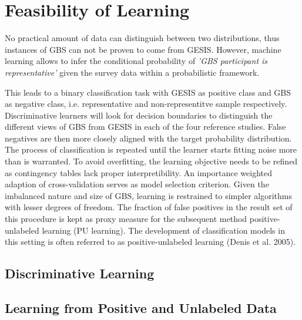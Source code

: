 \chapter{Feasibility of Learning}\label{Sec:Feasibility of Learning}

No practical amount of data can distinguish between two distributions, thus instances of GBS can not be proven to come from GESIS. However, machine learning allows to infer the conditional probability of \textit{'GBS participant is representative'} given the survey data within a probabilistic framework. 

This leads to a binary classification task with GESIS as positive class and GBS as negative class, i.e. representative and non-representitve sample respectively. Discriminative learners will look for decision boundaries to distinguish the different views of GBS from GESIS in each of the four reference studies. False negatives are then more closely aligned with the target probability distribution. The process of classification is repeated until the learner starts fitting noise more than is warranted. To avoid overfitting, the learning objective needs to be refined as contingency tables lack proper interpretibility. An importance weighted adaption of cross-validation serves as model selection criterion. Given the imbalanced nature and size of GBS, learning is restrained to simpler algorithms with lesser degrees of freedom. The fraction of false positives in the result set of this procedure is kept as proxy measure for the subsequent method positive-unlabeled learning (PU learning). The development of classiﬁcation models in this setting is often referred to as positive-unlabeled learning (Denis et al. 2005).



\section{Discriminative Learning}

\section{Learning from Positive and Unlabeled Data}

